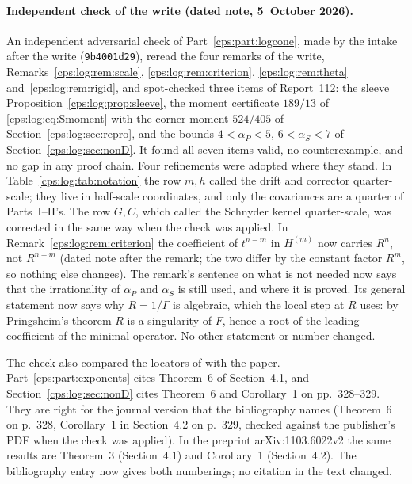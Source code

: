 \documentclass[11pt,letterpaper]{article}
\numberwithin{equation}{section}
\theoremstyle{remark}\newtheorem{remark}[theorem]{Remark}
\newcommand{\ap}{\alpha_P}\newcommand{\as}{\alpha_S}
\begin{document}
\paragraph{Independent check of the write (dated note, 5~October 2026).}
An independent adversarial check of Part~\ref{cps:part:logcone}, made by the intake after the
write (\texttt{9b4001d29}), reread the four remarks of the write,
Remarks~\ref{cps:log:rem:scale}, \ref{cps:log:rem:criterion}, \ref{cps:log:rem:theta}
and~\ref{cps:log:rem:rigid}, and spot-checked three items of Report~112: the sleeve
Proposition~\ref{cps:log:prop:sleeve}, the moment certificate $189/13$ of
\eqref{cps:log:eq:Smoment} with the corner moment $524/405$ of
Section~\ref{cps:log:sec:repro}, and the bounds $4<\ap<5$, $6<\as<7$ of
Section~\ref{cps:log:sec:nonD}. It found all seven items valid, no counterexample, and no gap in
any proof chain. Four refinements were adopted where they stand. In
Table~\ref{cps:log:tab:notation} the row $m,h$ called the drift and corrector quarter-scale; they
live in half-scale coordinates, and only the covariances are a quarter of Parts~I--II's. The row
$G,C$, which called the Schnyder kernel quarter-scale, was corrected in the same way when the
check was applied. In Remark~\ref{cps:log:rem:criterion} the coefficient of $t^{n-m}$ in
$H^{(m)}$ now carries $R^{n}$, not $R^{n-m}$ (dated note after the remark; the two differ by the
constant factor $R^{m}$, so nothing else changes). The remark's sentence on what is not needed
now says that the irrationality of $\ap$ and $\as$ is still used, and where it is proved. Its
general statement now says why $R=1/\Gamma$ is algebraic, which the local step at $R$ uses:
by Pringsheim's theorem $R$ is a singularity of $F$, hence a root of the leading coefficient of
the minimal operator. No other statement or number changed.

The check also compared the locators of \cite{FR} with the paper. Part~\ref{cps:part:exponents}
cites Theorem~6 of Section~4.1, and Section~\ref{cps:log:sec:nonD} cites Theorem~6 and
Corollary~1 on pp.~328--329. They are right for the journal version that the bibliography names
(Theorem~6 on p.~328, Corollary~1 in Section~4.2 on p.~329, checked against the publisher's PDF
when the check was applied). In the preprint arXiv:1103.6022v2 the same results are Theorem~3
(Section~4.1) and Corollary~1 (Section~4.2). The bibliography entry now gives both numberings;
no citation in the text changed.
\end{document}
